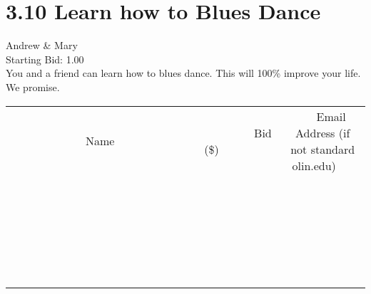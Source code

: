 \documentclass[11pt]{article}
\begin{document}
					\section*{3.10 Learn how to Blues Dance}
					Andrew \& Mary \\
					Starting Bid: 1.00 \\
					You and a friend can learn how to blues dance. This will 100\% improve your life. We promise. \\
					[6ex]
					\begin{tabular}{c c c}
						~~~~~~~~~~~~~Name~~~~~~~~~~~~~ & ~~~~~~~~~Bid (\$)~~~~~~~~~ & ~~~Email Address (if not standard olin.edu)~~~ \\
				
 & & \\
\hline
 & & \\
\hline
 & & \\
\hline
 & & \\
\hline
 & & \\
\hline
 & & \\
\hline
 & & \\
\hline
 & & \\
\hline
 & & \\
\hline
 & & \\
\hline
 & & \\
\hline
 & & \\
\hline
 & & \\
\hline
 & & \\
\hline
 & & \\
\hline
 & & \\
\hline
 & & \\
\hline
 & & \\
\hline
 & & \\
\hline
 & & \\
\hline
 & & \\
\hline
 & & \\
\hline
 & & \\
\hline
 & & \\
\hline
 & & \\
\hline
 & & \\
\hline
					\end{tabular}
					\clearpage
				
\end{document}
